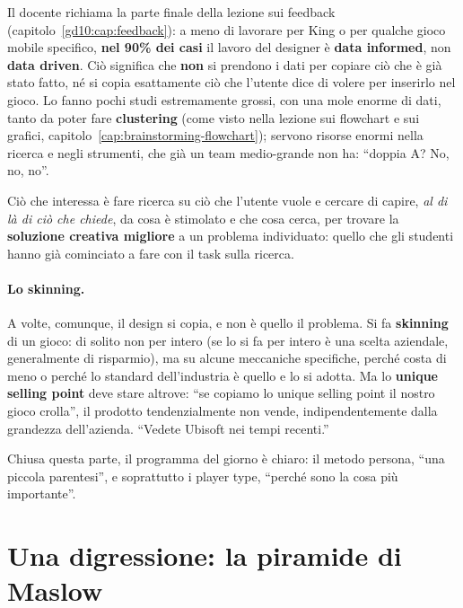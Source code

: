 Il docente richiama la parte finale della lezione sui feedback
(capitolo~\ref{gd10:cap:feedback}): a meno di lavorare per King o per qualche gioco
mobile specifico, \textbf{nel 90\% dei casi} il lavoro del designer è \textbf{data
informed}, non \textbf{data driven}. Ciò significa che \textbf{non} si prendono i dati
per copiare ciò che è già stato fatto, né si copia esattamente ciò che l'utente dice
di volere per inserirlo nel gioco. Lo fanno pochi studi estremamente grossi, con una
mole enorme di dati, tanto da poter fare \textbf{clustering} (come visto nella
lezione sui flowchart e sui grafici, capitolo~\ref{cap:brainstorming-flowchart});
servono risorse enormi nella ricerca e negli strumenti, che già un team medio-grande
non ha: ``doppia A? No, no, no''.

Ciò che interessa è fare ricerca su ciò che l'utente vuole e cercare di capire,
\emph{al di là di ciò che chiede}, da cosa è stimolato e che cosa cerca, per trovare
la \textbf{soluzione creativa migliore} a un problema individuato: quello che gli
studenti hanno già cominciato a fare con il task sulla ricerca.

\paragraph{Lo skinning.} A volte, comunque, il design si copia, e non è quello il
problema. Si fa \textbf{skinning} di un gioco: di solito non per intero (se lo si fa
per intero è una scelta aziendale, generalmente di risparmio), ma su alcune
meccaniche specifiche, perché costa di meno o perché lo standard dell'industria è
quello e lo si adotta. Ma lo \textbf{unique selling point} deve stare altrove: ``se
copiamo lo unique selling point il nostro gioco crolla'', il prodotto tendenzialmente
non vende, indipendentemente dalla grandezza dell'azienda. ``Vedete Ubisoft nei tempi
recenti.''

Chiusa questa parte, il programma del giorno è chiaro: il metodo persona, ``una
piccola parentesi'', e soprattutto i player type, ``perché sono la cosa più
importante''.


\section{Una digressione: la piramide di Maslow}
\label{gd18:sec:maslow}

